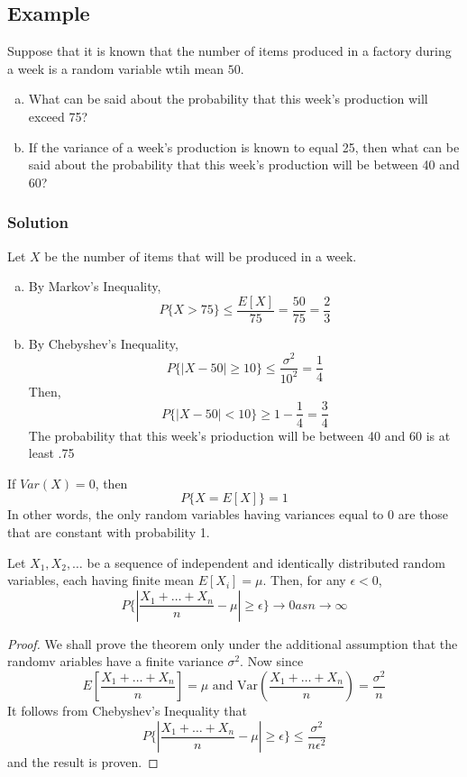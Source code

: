 \subsection*{Example}
Suppose that it is known that the number of items produced in a factory during a week is a random variable wtih mean $50$. \begin{enumerate}[a. ]
    \item What can be said about the probability that this week's production will exceed 75?
    \item If the variance of a week’s production is known to equal 25, then what can be said about the probability that this week’s production will be between 40 and 60?
\end{enumerate}
\subsubsection*{Solution}
Let $X$ be the number of items that will be produced in a week. 
\begin{enumerate}[a. ]
    \item By Markov's Inequality, \[P\{X > 75\}\leq\frac{E[X]}{75} = \frac{50}{75} = \frac{2}{3}\]
    \item By Chebyshev's Inequality, \[P\{|X - 50|\geq 10\}\leq\frac{\sigma^2}{10^2} = \frac{1}{4}\] Then, \[P\{|X - 50| < 10\}\geq 1 - \frac{1}{4} = \boxed{\frac{3}{4}}\] The probability that this week's prioduction will be between 40 and 60 is at least .75
\end{enumerate}
\begin{remark}
If $Var(X) = 0$, then \[P\{X = E[X]\} = 1\] In other words, the only random variables having variances equal to 0 are those that are constant with probability 1. 
\end{remark}
\begin{theorem}
    Let $X_1, X_2, \dots$ be a sequence of independent and identically distributed random variables, each having finite mean $E[X_i] = \mu$. Then, for any $\epsilon < 0$, \[P\{|\frac{X_1 + \dots + X_n}{n} - \mu|\geq \epsilon\}\rightarrow 0 as n\rightarrow \infty\]
\end{theorem}
\begin{proof}
    We shall prove the theorem only under the additional assumption that the randomv ariables have a finite variance $\sigma^2$. Now since \[E\left[\frac{X_1 + \dots + X_n}{n}\right] = \mu \text{ and Var}\left(\frac{X_1 + \dots + X_n}{n}\right) =\frac{\sigma^2}{n}\] It follows from Chebyshev's Inequality that \[P\{|\frac{X_1 + \dots + X_n}{n} - \mu|\geq\epsilon\}\leq \frac{\sigma^2}{n\epsilon^2}\] and the result is proven.
\end{proof}
